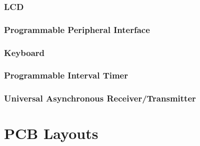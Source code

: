 \begin{appendices}
            \subsubsection{LCD} \label{sec:lcd_asm}

            \newpage
            \subsubsection{Programmable Peripheral Interface} \label{sec:ppi_asm}

            \newpage
            \subsubsection{Keyboard} \label{sec:keybrd_asm}

            \newpage
            \subsubsection{Programmable Interval Timer} \label{sec:pit_asm}

            \newpage
            \subsubsection{Universal Asynchronous Receiver/Transmitter} \label{sec:uart_asm}


    \clearpage
    \newpage

    \section{PCB Layouts} \label{appendix:pcb}


\end{appendices}
